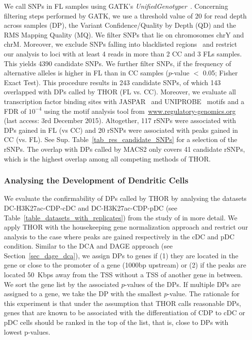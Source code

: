 We call SNPs in FL samples using GATK's \textit{UnifiedGenotyper}~\citep{McKenna2010}. 
Concerning filtering steps performed by GATK, we use a threshold value of 20 for read depth across samples (DP), the Variant Confidence/Quality by Depth (QD) and the RMS Mapping Quality (MQ).
We filter SNPs that lie on chromosomes chrY and chrM.
Moreover, we exclude SNPs falling into blacklisted regions~\citep{Dunham2012} and restrict our analysis to loci with at least 4 reads in more than 2 CC and 3 FLs samples. 
This yields 4390 candidate SNPs.
We further filter SNPs, if the frequency of alternative alleles is higher in FL than in CC samples ($p$-value $<$ 0.05; Fisher Exact Test). 
This procedure results in 243 candidate SNPs, of which 143 overlapped with DPs called by THOR (FL vs. CC). 
Moreover, we evaluate all transcription factor binding sites with JASPAR~\citep{Mathelier2014} and UNIPROBE~\citep{Robasky2011} motifs and a FDR of $10^{-4}$ using the motif analysis tool from~\url{www.regulatory-genomics.org} (last access: 3rd December 2015).
Altogether, 117 rSNPs were associated with DPs gained in FL (vs CC) and 20 rSNPs were associated with peaks gained in CC (vs. FL). 
See Sup. Table~\ref{tab_res_candidate_SNPs} for a selection of the rSNPs.
The overlap with DPs called by MACS2 only covers 41 candidate rSNPs, which is the highest overlap among all competing methods of THOR.


\subsubsection{Analysing the Development of Dendritic Cells}
We evaluate the confirmability of DPs called by THOR by analysing the datasets DC-H3K27\-ac-CDP-cDC and DC-H3K27ac-CDP-pDC (see Table~\ref{table_datasets_with_replicates}) from the study of \cite{Lin2015} in more detail.
We apply THOR with the housekeeping gene normalization approach and restrict our analysis to the case where peaks are gained respectively in the cDC and pDC condition.
Similar to the DCA and DAGE approach (see Section~\ref{sec_dage_dca}), we assign DPs to genes if (1) they are located in the gene or close to the promoter of a gene (1000bp upstream) or (2) if the peaks are located 50~Kbps away from the TSS without a TSS of another gene in between.
We sort the gene list by the associated $p$-values of the DPs. 
If multiple DPs are assigned to a gene, we take the DP with the smallest $p$-value. 
The rationale for this ex\-pe\-riment is that under the assumption that THOR calls reasonable DPs, genes that are known to be associated with the differentiation of CDP to cDC or pDC cells should be ranked in the top of the list, that is, close to DPs with lowest p-values. 



